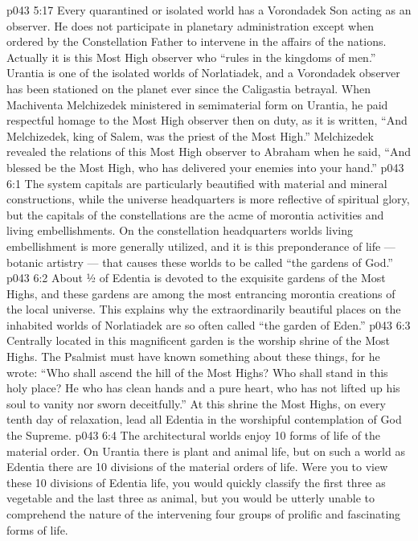 \vs p043 5:17 Every quarantined or isolated world has a Vorondadek Son acting as an observer. He does not participate in planetary administration except when ordered by the Constellation Father to intervene in the affairs of the nations. Actually it is this Most High observer who “rules in the kingdoms of men.” Urantia is one of the isolated worlds of Norlatiadek, and a Vorondadek observer has been stationed on the planet ever since the Caligastia betrayal. When Machiventa Melchizedek ministered in semimaterial form on Urantia, he paid respectful homage to the Most High observer then on duty, as it is written, “And Melchizedek, king of Salem, was the priest of the Most High.” Melchizedek revealed the relations of this Most High observer to Abraham when he said, “And blessed be the Most High, who has delivered your enemies into your hand.”
\vs p043 6:1 The system capitals are particularly beautified with material and mineral constructions, while the universe headquarters is more reflective of spiritual glory, but the capitals of the constellations are the acme of morontia activities and living embellishments. On the constellation headquarters worlds living embellishment is more generally utilized, and it is this preponderance of life --- botanic artistry --- that causes these worlds to be called “the gardens of God.”
\vs p043 6:2 \pc About ½ of Edentia is devoted to the exquisite gardens of the Most Highs, and these gardens are among the most entrancing morontia creations of the local universe. This explains why the extraordinarily beautiful places on the inhabited worlds of Norlatiadek are so often called “the garden of Eden.”
\vs p043 6:3 Centrally located in this magnificent garden is the worship shrine of the Most Highs. The Psalmist must have known something about these things, for he wrote: “Who shall ascend the hill of the Most Highs? Who shall stand in this holy place? He who has clean hands and a pure heart, who has not lifted up his soul to vanity nor sworn deceitfully.” At this shrine the Most Highs, on every tenth day of relaxation, lead all Edentia in the worshipful contemplation of God the Supreme.
\vs p043 6:4 \pc The architectural worlds enjoy 10 forms of life of the material order. On Urantia there is plant and animal life, but on such a world as Edentia there are 10 divisions of the material orders of life. Were you to view these 10 divisions of Edentia life, you would quickly classify the first three as vegetable and the last three as animal, but you would be utterly unable to comprehend the nature of the intervening four groups of prolific and fascinating forms of life.

